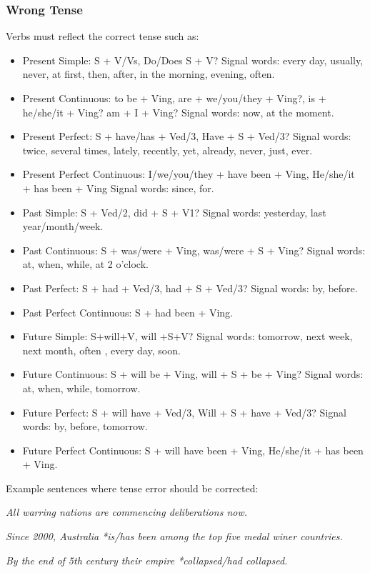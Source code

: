 \documentclass[12pt]{article}
\begin{document}
\subsubsection{Wrong Tense}
Verbs must reflect the correct tense such as:
\begin{itemize}[-]
\item Present Simple: S + V/Vs, Do/Does S + V? Signal words: every day, usually, never, at first, then, after, in the morning, evening, often.
\item Present Continuous: to be + Ving, are + we/you/they + Ving?, is + he/she/it + Ving?
am + I + Ving? Signal words: now, at the moment.
\item Present Perfect: S + have/has + Ved/3, Have + S + Ved/3? Signal words: twice, several times, lately, recently, yet, already, never, just, ever.
\item Present Perfect Continuous: I/we/you/they + have been + Ving, He/she/it + has been + Ving Signal words: since, for.
\item Past Simple: S + Ved/2, did + S + V1? Signal words: yesterday, last year/month/week.
\item Past Continuous: S + was/were + Ving, was/were + S + Ving? Signal words: at, when, while, at 2 o’clock.
\item Past Perfect: S + had + Ved/3, had + S + Ved/3? Signal words: by, before.
\item Past Perfect Continuous: S + had been + Ving.
\item Future Simple: S+will+V, will +S+V? Signal words: tomorrow, next week, next month, often , every day, soon.
\item Future Continuous: S + will be + Ving, will + S + be + Ving? Signal words: at, when, while, tomorrow.
\item Future Perfect: S + will have + Ved/3, Will + S + have + Ved/3? Signal words:  by, before, tomorrow.
\item Future Perfect Continuous: S + will have been + Ving, He/she/it + has been + Ving.
\end{itemize}

Example sentences where tense error should be corrected:

{\it All warring nations are commencing deliberations now.}

{\it Since 2000, Australia *is/has been among the top five medal winer countries.}

{\it By the end of 5th century their empire *collapsed/had collapsed.}
\end{document}
